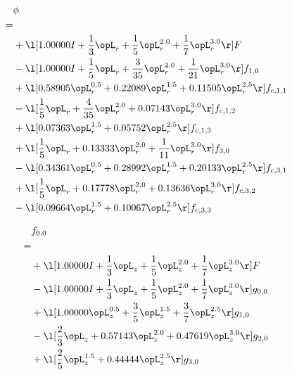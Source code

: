 \begin{alignat}{2} 
\label{eq:scalarFlux_0} 
& \phi \nonumber \\ 
 = \\ 
& + \l[  1.00000 I + \frac{1}{3} \opL_r + \frac{1}{5} \opL_r^{2.0} + \frac{1}{7} \opL_r^{3.0}  \r] F \nonumber \\ 
& - \l[  1.00000 I + \frac{1}{5} \opL_r + \frac{3}{35} \opL_r^{2.0} + \frac{1}{21} \opL_r^{3.0}  \r] f_{1,0} \nonumber \\ 
& + \l[  0.58905 \opL_r^{0.5} +  0.22089 \opL_r^{1.5} +  0.11505 \opL_r^{2.5}  \r] f_{c,1,1} \nonumber \\ 
& - \l[ \frac{1}{5} \opL_r + \frac{4}{35} \opL_r^{2.0} +  0.07143 \opL_r^{3.0}  \r] f_{c,1,2} \nonumber \\ 
& + \l[  0.07363 \opL_r^{1.5} +  0.05752 \opL_r^{2.5}  \r] f_{c,1,3} \nonumber \\ 
& + \l[ \frac{1}{5} \opL_r +  0.13333 \opL_r^{2.0} + \frac{1}{11} \opL_r^{3.0}  \r] f_{3,0} \nonumber \\ 
& - \l[  0.34361 \opL_r^{0.5} +  0.28992 \opL_r^{1.5} +  0.20133 \opL_r^{2.5}  \r] f_{c,3,1} \nonumber \\ 
& + \l[ \frac{1}{5} \opL_r +  0.17778 \opL_r^{2.0} +  0.13636 \opL_r^{3.0}  \r] f_{c,3,2} \nonumber \\ 
& - \l[  0.09664 \opL_r^{1.5} +  0.10067 \opL_r^{2.5}  \r] f_{c,3,3} \nonumber \\ 
\end{alignat} 


\begin{alignat}{2} 
\label{eq:f_00_0} 
& f_{0,0} \nonumber \\ 
 = \\ 
& + \l[  1.00000 I + \frac{1}{3} \opL_z + \frac{1}{5} \opL_z^{2.0} + \frac{1}{7} \opL_z^{3.0}  \r] F \nonumber \\ 
& - \l[  1.00000 I + \frac{1}{3} \opL_z + \frac{1}{5} \opL_z^{2.0} + \frac{1}{7} \opL_z^{3.0}  \r] g_{0,0} \nonumber \\ 
& + \l[  1.00000 \opL_z^{0.5} + \frac{3}{5} \opL_z^{1.5} + \frac{3}{7} \opL_z^{2.5}  \r] g_{1,0} \nonumber \\ 
& - \l[ \frac{2}{3} \opL_z +  0.57143 \opL_z^{2.0} +  0.47619 \opL_z^{3.0}  \r] g_{2,0} \nonumber \\ 
& + \l[ \frac{2}{5} \opL_z^{1.5} +  0.44444 \opL_z^{2.5}  \r] g_{3,0} \nonumber \\ 
\end{alignat} 


